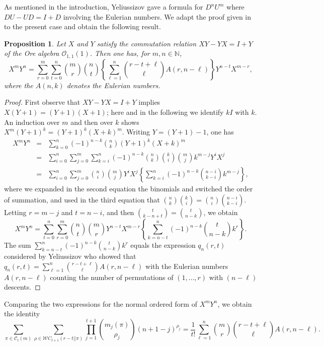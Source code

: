 \documentclass[10pt]{amsart}
\newtheorem{proposition}[theorem]{Proposition}%
\begin{document}
As mentioned in the introduction, Yeliussizov \cite[Lemma 10.2]{DY2019} gave a formula for $D^nU^m$ where $DU-UD=I+D$ involving the Eulerian numbers. We adapt the proof given in  \cite{DY2019} to the present case and obtain the following result.
\begin{proposition}
Let $X$ and $Y$ satisfy the commutation relation $XY-YX=I+Y$ of the Ore algebra ${\mathcal O}_{1,1}(1)$. Then one has, for $m,n \in {\mathbb N}$,
$$
X^mY^n=\sum_{r=0}^m \sum_{t=0}^n   \binom{m}{r}\binom{n}{t} \left\{ \sum_{\ell=1}^n \binom{r-t+\ell}{\ell}A(r,n-\ell) \right\} Y^{n-t}X^{m-r},
$$
where the $A(n,k)$ denotes the Eulerian numbers.
\end{proposition}
\begin{proof}
First observe that $XY-YX=I+Y$ implies $X(Y+1)=(Y+1)(X+1)$; here and in the following we identify $kI$ with $k$. An induction over $m$ and then over $k$ shows $X^m(Y+1)^k=(Y+1)^k(X+k)^m$. Writing $Y=(Y+1)-1$, one has
\begin{eqnarray*}
X^mY^n&=&\sum_{k=0}^n (-1)^{n-k}\binom{n}{k}(Y+1)^k(X+k)^m \\
&=&  \sum_{i=0}^n \sum_{j=0}^m \sum_{k=i}^n (-1)^{n-k}\binom{n}{k} \binom{k}{i}\binom{m}{j}k^{m-j} Y^{i} X^j \\ &=&  \sum_{i=0}^n \sum_{j=0}^m \binom{n}{i} \binom{m}{j} Y^{i}X^j \left\{ \sum_{k=i}^n (-1)^{n-k}\binom{n-i}{k-i}k^{m-j}\right\},
\end{eqnarray*}
where we expanded in the second equation the binomials and switched the order of summation, and used in the third equation that $\binom{n}{k} \binom{k}{i}=\binom{n}{i} \binom{n-i}{k-i}$. Letting $r=m-j$ and $t=n-i$, and then $\binom{t}{k-n+t}=\binom{t}{n-k}$, we obtain
$$
X^mY^n=  \sum_{t=0}^n \sum_{r=0}^m \binom{n}{t} \binom{m}{r} Y^{n-t}X^{m-r} \left\{ \sum_{k=n-t}^n (-1)^{n-k}\binom{t}{n-k}k^{r}\right\}. 
$$
The sum $\sum_{k=n-t}^n (-1)^{n-k}\binom{t}{n-k}k^{r}$ equals the expression $q_n(r,t)$ considered by Yeliussizov \cite{DY2019} who showed that $q_n(r,t)=\sum_{\ell=1}^n \binom{r-t+\ell}{\ell}A(r,n-\ell)$  with the Eulerian numbers $A(r,n-\ell)$ counting the number of permutations of $(1,\ldots,r)$ with $(n-\ell)$ descents.
\end{proof}
Comparing the two expressions for the normal ordered form of $X^mY^n$, we obtain the identity
$$
\sum_{\pi \in {\mathcal C}_t(m)} \sum_{\rho \in {\mathcal WC}_{t+1}(r-t || \pi)} \prod_{j=1}^{t+1} \binom{m_{j}(\pi)}{\rho_{j}}(n+1-j)^{\rho_{j}} =\frac{1}{t!}\sum_{\ell=1}^{n} \binom{m}{r}\binom{r-t+\ell}{\ell}A(r,n-\ell). 
$$
\end{document}
